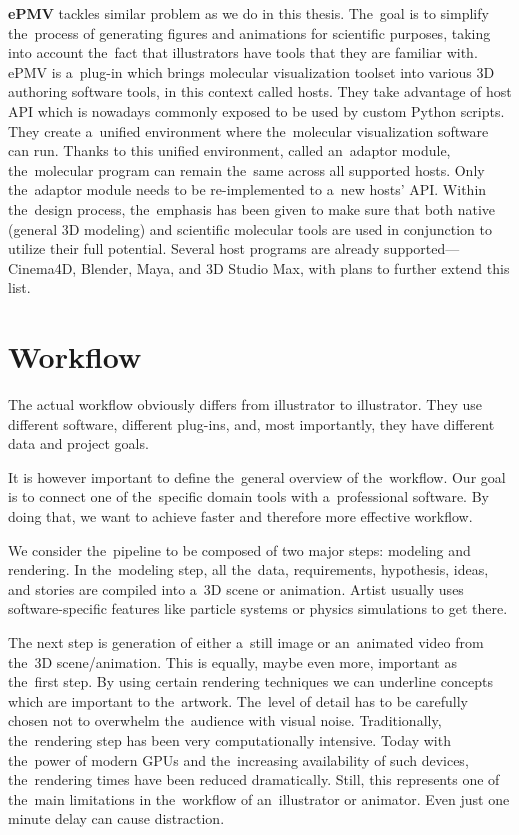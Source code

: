 \documentclass[
  digital, %
  table,   %
  nolof,     %
  nolot,     %
  oneside,
]{fithesis3}
\begin{document}
\textbf{ePMV} \cite{ePMV} tackles similar problem as we do in this thesis. The goal is to simplify the process of generating figures and animations for scientific purposes, taking into account the fact that illustrators have tools that they are familiar with. ePMV is a plug-in which brings molecular visualization toolset into various 3D authoring software tools, in this context called hosts. They take advantage of host API which is nowadays commonly exposed to be used by custom Python scripts. They create a unified environment where the molecular visualization software can run. Thanks to this unified environment, called an adaptor module, the molecular program can remain the same across all supported hosts. Only the adaptor module needs to be re-implemented to a new hosts' API. Within the design process, the emphasis has been given to make sure that both native (general 3D modeling) and scientific molecular tools are used in conjunction to utilize their full potential.
Several host programs are already supported—Cinema4D, Blender, Maya, and 3D Studio Max, with plans to further extend this list.

\section{Workflow}
The actual workflow obviously differs from illustrator to illustrator. They use different software, different plug-ins, and, most importantly, they have different data and project goals.

It is however important to define the general overview of the workflow. Our goal is to connect one of the specific domain tools with a professional software. By doing that, we want to achieve faster and therefore more effective workflow.

We consider the pipeline to be composed of two major steps: modeling and rendering. In the modeling step, all the data, requirements, hypothesis, ideas, and stories are compiled into a 3D scene or animation. Artist usually uses software-specific features like particle systems or physics simulations to get there.

The next step is generation of either a still image or an animated video from the 3D scene/animation. This is equally, maybe even more, important as the first step. By using certain rendering techniques we can underline concepts which are important to the artwork. The level of detail has to be carefully chosen not to overwhelm the audience with visual noise. Traditionally, the rendering step has been very computationally intensive. Today with the power of modern GPUs and the increasing availability of such devices, the rendering times have been reduced dramatically. Still, this represents one of the main limitations in the workflow of an illustrator or animator. Even just one minute delay can cause distraction.
\end{document}
